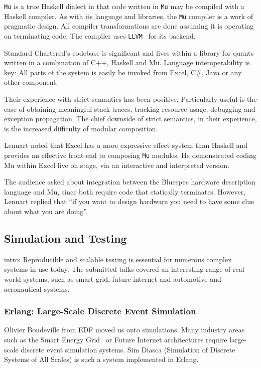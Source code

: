 \documentclass{jfp1}
\begin{document}
{\tt Mu} is a true Haskell dialect in that code written in {\tt Mu}
may be compiled with a Haskell compiler.  As with its language and
libraries, the {\tt Mu} compiler is a work of pragmatic design.  All
compiler transformations are done assuming it is operating on
terminating code.  The compiler uses {\tt LLVM}~\cite{llvm} for its
backend.

Standard Chartered's codebase is significant and lives within a
library for quants written in a combination of C++, Haskell and Mu.
Language interoperability is key: All parts of the system is easily be
invoked from Excel, C\#, Java or any other component.

Their experience with strict semantics has been positive.
Particularly useful is the ease of obtaining meaningful stack traces,
tracking resource usage, debugging and exception propagation.  The
chief downside of strict semantics, in their experience, is the
increased difficulty of modular composition.

Lennart noted that Excel has a more expressive effect system than
Haskell and provides an effective front-end to composing {\tt Mu}
modules.  He demonstrated coding Mu within Excel live on stage, via an
interactive and interpreted version.

The audience asked about integration between the Bluespec hardware description
language and Mu, since both require code that statically terminates. However,
Lennart replied that ``if you want to design hardware you need to have some
clue about what you are doing''.

\subsection{Simulation and Testing}

intro: Reproducible and scalable testing is essential for numerous
complex systems in use today.  The submitted talks covered an
interesting range of real-world systems, such as smart grid, future
internet and automotive and aeronautical systems.

\subsubsection{Erlang: Large-Scale Discrete Event Simulation}

Olivier Boudeville from EDF moved us onto simulations.  Many industry
areas such as the Smart Energy Grid~\cite{x} or Future Internet
architectures require large-scale discrete event simulation systems.
Sim Diasca (Simulation of Discrete Systems of All Scales) is such a
system implemented in Erlang.
\end{document}
